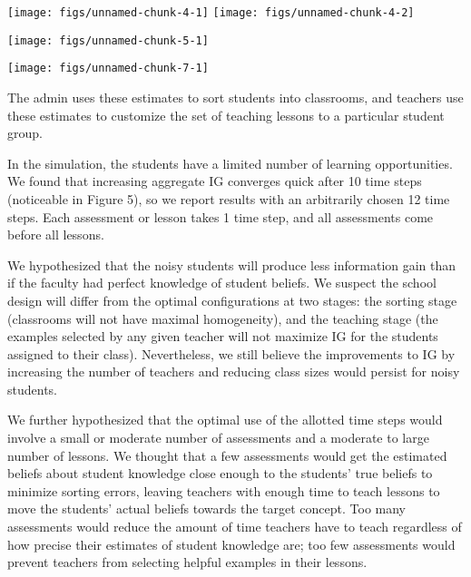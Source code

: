\documentclass[10pt, letterpaper]{article}
\newenvironment{CodeChunk}{}{}
\begin{document}
\begin{CodeChunk}

\texttt{[image: figs/unnamed-chunk-4-1]} 
\texttt{[image: figs/unnamed-chunk-4-2]} \end{CodeChunk}

\begin{CodeChunk}

\texttt{[image: figs/unnamed-chunk-5-1]} \end{CodeChunk}

\begin{CodeChunk}

\texttt{[image: figs/unnamed-chunk-7-1]} \end{CodeChunk}

The admin uses these estimates to sort students into classrooms, and
teachers use these estimates to customize the set of teaching lessons to
a particular student group.

In the simulation, the students have a limited number of learning
opportunities. We found that increasing aggregate IG converges quick
after 10 time steps (noticeable in Figure 5), so we report results with
an arbitrarily chosen 12 time steps. Each assessment or lesson takes 1
time step, and all assessments come before all lessons.

We hypothesized that the noisy students will produce less information
gain than if the faculty had perfect knowledge of student beliefs. We
suspect the school design will differ from the optimal configurations at
two stages: the sorting stage (classrooms will not have maximal
homogeneity), and the teaching stage (the examples selected by any given
teacher will not maximize IG for the students assigned to their class).
Nevertheless, we still believe the improvements to IG by increasing the
number of teachers and reducing class sizes would persist for noisy
students.

We further hypothesized that the optimal use of the allotted time steps
would involve a small or moderate number of assessments and a moderate
to large number of lessons. We thought that a few assessments would get
the estimated beliefs about student knowledge close enough to the
students' true beliefs to minimize sorting errors, leaving teachers with
enough time to teach lessons to move the students' actual beliefs
towards the target concept. Too many assessments would reduce the amount
of time teachers have to teach regardless of how precise their estimates
of student knowledge are; too few assessments would prevent teachers
from selecting helpful examples in their lessons.
\end{document}
